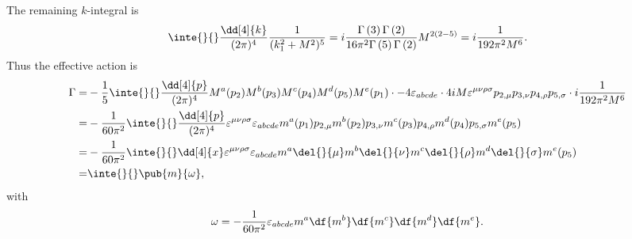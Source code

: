 The remaining $k$-integral is
\begin{align*}
	\inte{}{}\frac{\dd[4]{k}}{(2\pi)^{4}}\frac{1}{(k_{1}^{2} + M^{2})^{5}} = i\frac{\Gamma\left(3\right)\Gamma\left(2\right)}{16\pi^{2}\Gamma\left(5\right)\Gamma\left(2\right)}M^{2(2 - 5)} = i\frac{1}{192\pi^{2}M^{6}}.
\end{align*}
Thus the effective action is
\begin{align*}
	\Gamma =& -\frac{1}{5}\inte{}{}\frac{\dd[4]{p}}{(2\pi)^{4}}M^{a}(p_{2})M^{b}(p_{3})M^{c}(p_{4})M^{d}(p_{5})M^{e}(p_{1})\cdot -4\varepsilon_{abcde}\cdot 4iM\varepsilon^{\mu\nu\rho\sigma}p_{2, \mu}p_{3, \nu}p_{4, \rho}p_{5, \sigma}\cdot i\frac{1}{192\pi^{2}M^{6}} \\
	=& -\frac{1}{60\pi^{2}}\inte{}{}\frac{\dd[4]{p}}{(2\pi)^{4}}\varepsilon^{\mu\nu\rho\sigma}\varepsilon_{abcde}m^{a}(p_{1})p_{2, \mu}m^{b}(p_{2})p_{3, \nu}m^{c}(p_{3})p_{4, \rho}m^{d}(p_{4})p_{5, \sigma}m^{e}(p_{5}) \\
	=& -\frac{1}{60\pi^{2}}\inte{}{}\dd[4]{x}\varepsilon^{\mu\nu\rho\sigma}\varepsilon_{abcde}m^{a}\del{}{\mu}m^{b}\del{}{\nu}m^{c}\del{}{\rho}m^{d}\del{}{\sigma}m^{e}(p_{5}) \\
	=& \inte{}{}\pub{m}{\omega},
\end{align*}
with
\begin{align*}
	\omega = -\frac{1}{60\pi^{2}}\varepsilon_{abcde}m^{a}\df{m^{b}}\df{m^{c}}\df{m^{d}}\df{m^{e}}.
\end{align*}